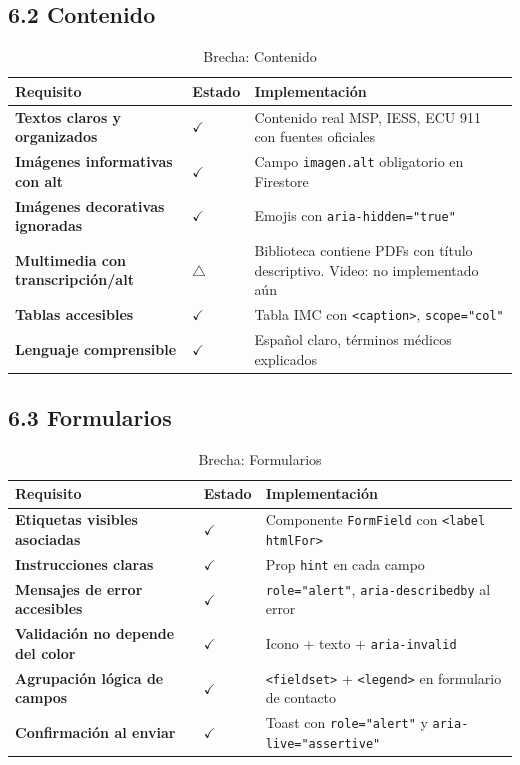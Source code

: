 \documentclass[12pt, a4paper]{article}
\newcommand{\cmark}{\textcolor{successgreen}{$\checkmark$}}
\newcommand{\wmark}{\textcolor{warningyellow}{$\triangle$}}
\begin{document}
\subsection{6.2 Contenido}

\begin{table}[H]
\centering
\caption{Brecha: Contenido}
\small
\begin{tabular}{@{}>{\bfseries}p{5cm} >{\centering\arraybackslash}p{2cm} p{6.5cm}@{}}
\toprule
\rowcolor{royalblue!12}
\textbf{Requisito} & \textbf{Estado} & \textbf{Implementación} \\
\midrule
Textos claros y organizados & \cmark & Contenido real MSP, IESS, ECU 911 con fuentes oficiales \\
Imágenes informativas con alt & \cmark & Campo \texttt{imagen.alt} obligatorio en Firestore \\
Imágenes decorativas ignoradas & \cmark & Emojis con \texttt{aria-hidden="true"} \\
Multimedia con transcripción/alt & \wmark & Biblioteca contiene PDFs con título descriptivo. Video: no implementado aún \\
Tablas accesibles & \cmark & Tabla IMC con \texttt{<caption>}, \texttt{scope="col"} \\
Lenguaje comprensible & \cmark & Español claro, términos médicos explicados \\
\bottomrule
\end{tabular}
\end{table}

\subsection{6.3 Formularios}

\begin{table}[H]
\centering
\caption{Brecha: Formularios}
\small
\begin{tabular}{@{}>{\bfseries}p{5cm} >{\centering\arraybackslash}p{2cm} p{6.5cm}@{}}
\toprule
\rowcolor{royalblue!12}
\textbf{Requisito} & \textbf{Estado} & \textbf{Implementación} \\
\midrule
Etiquetas visibles asociadas & \cmark & Componente \texttt{FormField} con \texttt{<label htmlFor>} \\
Instrucciones claras & \cmark & Prop \texttt{hint} en cada campo \\
Mensajes de error accesibles & \cmark & \texttt{role="alert"}, \texttt{aria-describedby} al error \\
Validación no depende del color & \cmark & Icono + texto + \texttt{aria-invalid} \\
Agrupación lógica de campos & \cmark & \texttt{<fieldset>} + \texttt{<legend>} en formulario de contacto \\
Confirmación al enviar & \cmark & Toast con \texttt{role="alert"} y \texttt{aria-live="assertive"} \\
\bottomrule
\end{tabular}
\end{table}
\end{document}
